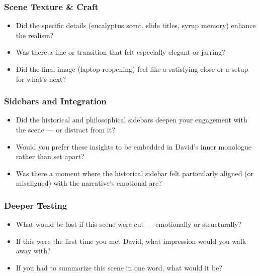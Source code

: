 \subsubsection{Scene Texture \& Craft}

\begin{itemize}
  \item Did the specific details (eucalyptus scent, slide titles, syrup memory) enhance the realism?
  \item Was there a line or transition that felt especially elegant or jarring?
  \item Did the final image (laptop reopening) feel like a satisfying close or a setup for what’s next?
\end{itemize}

\subsubsection{Sidebars and Integration}

\begin{itemize}
  \item Did the historical and philosophical sidebars deepen your engagement with the scene — or distract from it?
  \item Would you prefer these insights to be embedded in David’s inner monologue rather than set apart?
  \item Was there a moment where the historical sidebar felt particularly aligned (or misaligned) with the narrative’s emotional arc?
\end{itemize}

\subsubsection{Deeper Testing}

\begin{itemize}
  \item What would be lost if this scene were cut — emotionally or structurally?
  \item If this were the first time you met David, what impression would you walk away with?
  \item If you had to summarize this scene in one word, what would it be?
\end{itemize}
